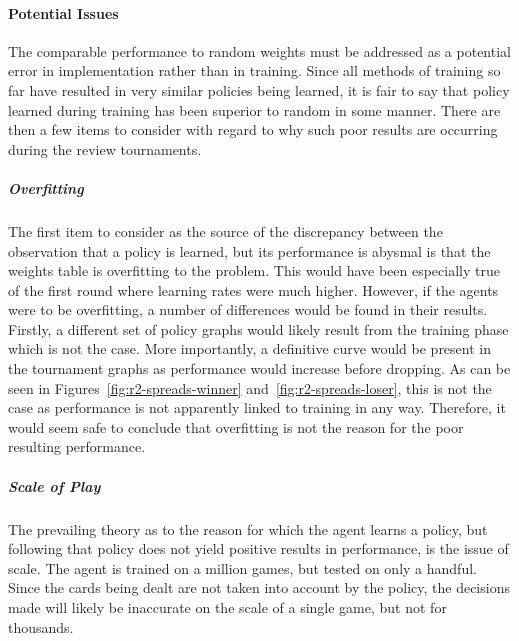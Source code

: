 
\paragraph*{Potential Issues}
\label{sec:findings-r2-potentialissues}

The comparable performance to random weights must be addressed as a potential
error in implementation rather than in training.
%
Since all methods of training so far have resulted in very similar policies
being learned,
it is fair to say that policy learned during training has been superior to
random in some manner.
%
There are then a few items to consider with regard to why such poor results are occurring
during the review tournaments.


\subparagraph*{Overfitting}

The first item to consider as the source of the discrepancy between the
observation that a policy is learned,
but its performance is abysmal
is that the weights table is overfitting to the problem.
%
This would have been especially true of the first round where learning rates
were much higher.
%
However,
if the agents were to be overfitting,
a number of differences would be found in their results.
%
Firstly,
a different set of policy graphs would likely result from the training phase
which is not the case. %
%
More importantly,
a definitive curve would be present in the tournament graphs as performance
would increase before dropping.
%
As can be seen in Figures~\ref{fig:r2-spreads-winner}
and~\ref{fig:r2-spreads-loser},
this is not the case
as performance is not apparently linked to training in any way.
%
Therefore, it would seem safe to conclude that overfitting is not the reason
for the poor resulting performance.


\subparagraph*{Scale of Play}

The prevailing theory as to the reason for which the agent learns a policy,
but following that policy does not yield positive results in performance,
is the issue of scale.
%
The agent is trained on a million games,
but tested on only a handful.
%
Since the cards being dealt are not taken into account by the policy,
the decisions made will likely be inaccurate on the scale of a single game,
but not for thousands.




